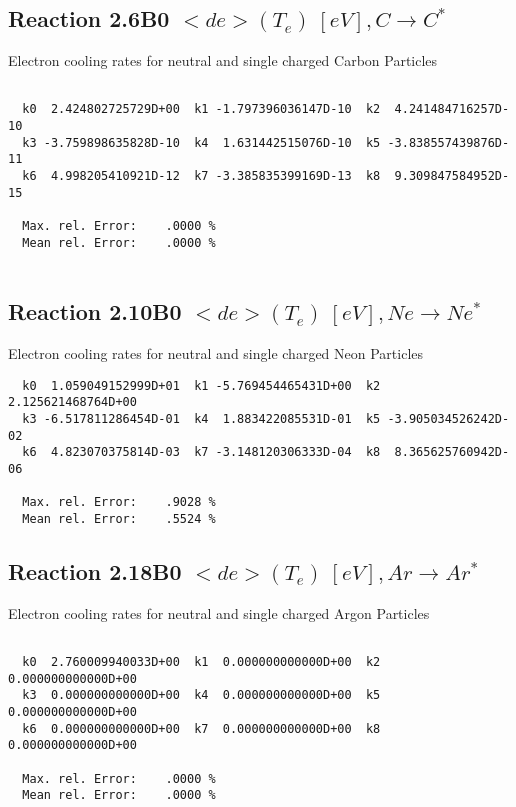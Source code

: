 \documentclass[12pt]{article}
\begin{document}
\subsection{
Reaction 2.6B0   $ <de>(T_e) \ [eV], C \rightarrow C^* $
}

 Electron cooling rates for neutral and single
 charged Carbon Particles

\begin{small}\begin{verbatim}

  k0  2.424802725729D+00  k1 -1.797396036147D-10  k2  4.241484716257D-10
  k3 -3.759898635828D-10  k4  1.631442515076D-10  k5 -3.838557439876D-11
  k6  4.998205410921D-12  k7 -3.385835399169D-13  k8  9.309847584952D-15

  Max. rel. Error:    .0000 %
  Mean rel. Error:    .0000 %


\end{verbatim}\end{small}

\subsection{
Reaction 2.10B0   $ <de>(T_e) \ [eV], Ne \rightarrow Ne^* $
}

 Electron cooling rates for neutral and single
 charged Neon Particles

\begin{small}\begin{verbatim}
  k0  1.059049152999D+01  k1 -5.769454465431D+00  k2  2.125621468764D+00
  k3 -6.517811286454D-01  k4  1.883422085531D-01  k5 -3.905034526242D-02
  k6  4.823070375814D-03  k7 -3.148120306333D-04  k8  8.365625760942D-06

  Max. rel. Error:    .9028 %
  Mean rel. Error:    .5524 %

\end{verbatim}\end{small}


\subsection{
Reaction 2.18B0  $  <de>(T_e) \ [eV], Ar \rightarrow Ar^*$
}

  Electron cooling rates for neutral and single
  charged Argon Particles

\begin{small}\begin{verbatim}

  k0  2.760009940033D+00  k1  0.000000000000D+00  k2  0.000000000000D+00
  k3  0.000000000000D+00  k4  0.000000000000D+00  k5  0.000000000000D+00
  k6  0.000000000000D+00  k7  0.000000000000D+00  k8  0.000000000000D+00

  Max. rel. Error:    .0000 %
  Mean rel. Error:    .0000 %

\end{verbatim}\end{small}
\end{document}

